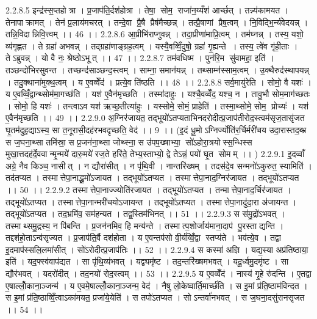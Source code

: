 2.2.8.5
इन्द्र॑स्स॒प्तहोत्रा । प्र॒जाप॑ति॒र्दश॑होत्रा । तेषा॒॒ सोम॒॒ राजा॑न॒य्यँश॑ आर्च्छत् । तन्न्य॑कामयत । तेनापाक्रामत् । तेन॑ प्र॒लाय॑मचरत् । तन्दे॒वा प्रै॒षै प्रैष॑मैच्छन्न् । तत्प्रै॒षाणां प्रैष॒त्वम् । नि॒विद्भि॒र्न्य॑वेदयन्न् । तन्नि॒विदान्निवि॒त्त्वम् ।। 46 ।।
2.2.8.6
आ॒प्रीभि॑राप्नुवन्न् । तदा॒प्रीणा॑माप्रि॒त्वम् । तम॑घ्नन्न् । तस्य॒ यशो॒ व्य॑गृह्णत । ते ग्रहा॑ अभवन्न् । तद्ग्रहा॑णाङ्ग्रह॒त्वम् । यस्यै॒वव्विँ॒दुषो॒ ग्रहा॑ गृ॒ह्यन्ते । तस्य॒ त्वे॑व गृ॑ही॒ताः । तेऽब्रुवन्न् । यो वै नः॒ श्रेष्ठोऽभूत् ।। 47 ।।
2.2.8.7
तम॑वधिष्म । पुन॑रि॒म सु॑वामहा॒ इति॑ । तञ्छन्दो॑भिरसुवन्त । तच्छन्द॑साञ्छन्द॒स्त्वम् । साम्ना॒ समान॑यन्न् । तथ्साम्न॑स्साम॒त्वम् । उ॒क्थैरुद॑स्थापयन्न् । तदु॒क्थाना॑मुक्थ॒त्वम् । य ए॒वव्वेँद॑ । प्रत्ये॒व ति॑ष्ठति ।। 48 ।।
2.2.8.8
सर्व॒मायु॑रेति । सोमो॒ वै यशः॑ । य ए॒वव्विँ॒द्वान्थ्सोम॑मा॒गच्छ॑ति । यश॑ ए॒वैन॑मृच्छति । तस्मा॑दाहुः । यश्चै॒वव्वेँद॒ यश्च॒ न । तावु॒भौ सोम॒माग॑च्छतः । सोमो॒ हि यशः॑ । तन्त्वाऽव यश॑ ऋच्छ॒तीत्या॑हुः । यस्सोमे॒ सोमं॒ प्राहेति॑ । तस्मा॒थ्सोमे॒ सोम॒ प्रोच्यः॑ । यश॑ ए॒वैन॑मृच्छति ।। 49 ।।
2.2.9.0
अ॒ग्निर॑जायत॒ तद्भूयो॑ऽतप्यताभिनदरोदीत्प्र॒जाप॑तीरोद॒स्त्वम॑सृज॒तासृ॑जत घृ॒तम॑दुह॒द्याऽस्य॒ सा त॒नूरासी॒दह॑रभवदृच्छति॒ वेद॑ ।। 9 ।। (इ॒दं धू॒मोऽग्निर्ज्योति॑र॒र्चिर्मरी॑चय उदा॒रास्तद॒ब्भ्र स ज॒घना॒थ्सा तमि॑स्रा॒ स प्र॒जन॑ना॒थ्सा जोथ्स्ना॒ स उ॑पप॒ख्षाभ्या॒॒ सो॑ऽहोरा॒त्रयोस्स॒न्धिस्स मुखा॒त्तदह॑र्दे॒ववान्मृ॒न्मये॑ दारु॒मये॑ रज॒ते हरि॑ते॒ तेभ्य॒स्ताभ्यो॒ द्वे तेऽन्नं॒ पयो॑ घृ॒त सोमम् ।। )
2.2.9.1
इ॒दव्वाँ अग्रे॒ नैव किञ्च॒ नासीत् । न द्यौरा॑सीत् । न पृ॑थि॒वी । नान्तरि॑ख्षम् । तदस॑दे॒व सन्मनो॑ऽकुरुत॒ स्यामिति॑ । तद॑तप्यत । तस्मात्तेपा॒नाद्धू॒मो॑ऽजायत । तद्भूयो॑ऽतप्यत । तस्मात्तेपा॒नाद॒ग्निर॑जायत । तद्भूयो॑ऽतप्यत ।। 50 ।।
2.2.9.2
तस्मात्तेपा॒नाज्ज्योति॑रजायत । तद्भूयो॑ऽतप्यत । तन्मात्तेपा॒नाद॒र्चिर॑जायत । तद्भूयो॑ऽतप्यत । तस्मात्तेपा॒नान्मरी॑चयोऽजायन्त । तद्भूयो॑ऽतप्यत । तस्मात्तेपा॒नादु॑दा॒रा अ॑जायन्त । तद्भूयो॑ऽतप्यत । तद॒भ्रमि॑व॒ सम॑हन्यत । तद्व॒स्तिम॑भिनत् ।। 51 ।।
2.2.9.3
स स॑मु॒द्रो॑ऽभवत् । तस्माथ्समु॒द्रस्य॒ न पि॑बन्ति । प्र॒जन॑नमिव॒ हि मन्य॑न्ते । तस्मात्प॒शोर्जाय॑माना॒दाप॑ पु॒रस्ताद्यन्ति । तद्दश॑हो॒ताऽन्व॑सृज्यत । प्र॒जाप॑ति॒र्वै दश॑होता । य ए॒वन्तप॑सो वी॒र्य॑व्विँ॒द्वा स्तप्य॑ते । भव॑त्ये॒व । तद्वा इ॒दमाप॑स्सलि॒लमा॑सीत् । सो॑ऽरोदीत्प्र॒जाप॑तिः ।। 52 ।।
2.2.9.4
स कस्मा॑ अज्ञि । यद्य॒स्या अप्र॑तिष्ठाया॒ इति॑ । यद॒फ्स्व॑वाप॑द्यत । सा पृ॑थि॒व्य॑भवत् । यद्व्यमृ॑ष्ट । तद॒न्तरि॑ख्षमभवत् । यदू॒र्ध्वमु॒दमृ॑ष्ट । सा द्यौर॑भवत् । यदरो॑दीत् । तद॒नयो॑ रोद॒स्त्वम् ।। 53 ।।
2.2.9.5
य ए॒वव्वेँद॑ । नास्य॑ गृ॒हे रु॑दन्ति । ए॒तद्वा ए॒षाल्लोँ॒काना॒ञ्जन्म॑ । य ए॒वमे॒षाल्लोँ॒काना॒ञ्जन्म॒ वेद॑ । नैषु लो॒केष्वार्ति॒मार्च्छ॑ति । स इ॒मां प्र॑ति॒ष्ठाम॑विन्दत । स इ॒मां प्र॑ति॒ष्ठाव्विँ॒त्वाऽका॑मयत॒ प्रजा॑ये॒येति॑ । स तपो॑ऽतप्यत । सोऽन्तर्वा॑नभवत् । स ज॒घना॒दसु॑रानसृजत ।। 54 ।।
